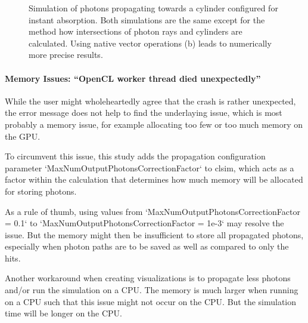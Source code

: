 \begin{figure}[htbp]
  \hfill
  \hfill
  \caption{Simulation of photons propagating towards a cylinder configured for instant absorption. Both simulations are the same except for the method how intersections of photon rays and cylinders are calculated. Using native vector operations (b) leads to numerically more precise results.}
  \label{fig:usie5Ohj}
\end{figure}



\paragraph{Memory Issues: ``OpenCL worker thread died unexpectedly''}
While the user might wholeheartedly agree that the crash is rather unexpected, the error message does not help to find the underlaying issue, which is most probably a memory issue, for example allocating too few or too much memory on the GPU.

To circumvent this issue, this study adds the propagation configuration parameter `MaxNumOutputPhotonsCorrectionFactor` to clsim, which acts as a factor within the calculation that determines how much memory will be allocated for storing photons.

As a rule of thumb, using values from `MaxNumOutputPhotonsCorrectionFactor = 0.1` to `MaxNumOutputPhotonsCorrectionFactor = 1e-3` may resolve the issue. But the memory might then be insufficient to store all propagated photons, especially when photon paths are to be saved as well as compared to only the hits.

Another workaround when creating visualizations is to propagate less photons and/or run the simulation on a CPU. The memory is much larger when running on a CPU such that this issue might not occur on the CPU. But the simulation time will be longer on the CPU.


